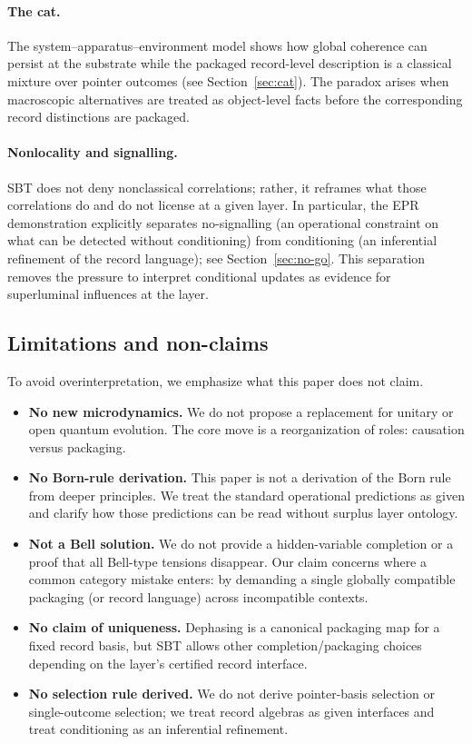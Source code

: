 \documentclass[11pt]{article}
\begin{document}
\paragraph{The cat.}
The system--apparatus--environment model shows how global coherence can persist at the substrate while the packaged record-level description is a classical mixture over pointer outcomes (see Section~\ref{sec:cat}).
The paradox arises when macroscopic alternatives are treated as object-level facts before the corresponding record distinctions are packaged.

\paragraph{Nonlocality and signalling.}
SBT does not deny nonclassical correlations; rather, it reframes what those correlations do and do not license at a given layer.
In particular, the EPR demonstration explicitly separates no-signalling (an operational constraint on what can be detected without conditioning) from conditioning (an inferential refinement of the record language); see Section~\ref{sec:no-go}.
This separation removes the pressure to interpret conditional updates as evidence for superluminal influences at the layer.

\subsection{Limitations and non-claims}

To avoid overinterpretation, we emphasize what this paper does not claim.

\begin{itemize}
  \item \textbf{No new microdynamics.} We do not propose a replacement for unitary or open quantum evolution. The core move is a reorganization of roles: causation versus packaging.
  \item \textbf{No Born-rule derivation.} This paper is not a derivation of the Born rule from deeper principles. We treat the standard operational predictions as given and clarify how those predictions can be read without surplus layer ontology.
  \item \textbf{Not a Bell solution.} We do not provide a hidden-variable completion or a proof that all Bell-type tensions disappear. Our claim concerns where a common category mistake enters: by demanding a single globally compatible packaging (or record language) across incompatible contexts.
  \item \textbf{No claim of uniqueness.} Dephasing is a canonical packaging map for a fixed record basis, but SBT allows other completion/packaging choices depending on the layer's certified record interface.
  \item \textbf{No selection rule derived.} We do not derive pointer-basis selection or single-outcome selection; we treat record algebras as given interfaces and treat conditioning as an inferential refinement.
\end{itemize}
\end{document}

